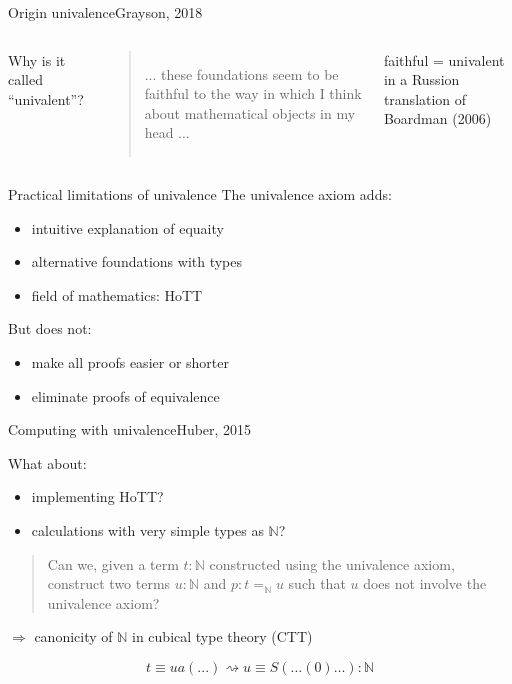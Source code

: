 \documentclass[english]{beamer}
\begin{document}
\begin{frame}{Origin univalence}{Grayson, 2018}
\begin{columns}[c]
            Why is it called ``univalent''?


        \pause

        \begin{quotation}
        ... these foundations seem to be faithful to the way in which I think about mathematical objects in my head ...
        \end{quotation}

        faithful = univalent in a Russion translation of Boardman (2006)

\end{columns}
\end{frame}

\begin{frame}{Practical limitations of univalence}
The univalence axiom adds:
\begin{itemize}
    \item intuitive explanation of equaity
    \item alternative foundations with types
    \item field of mathematics: HoTT
\end{itemize}

But does not:
\begin{itemize}
    \item make all proofs easier or shorter
    \item eliminate proofs of equivalence
\end{itemize}



\end{frame}

\begin{frame}{Computing with univalence}{Huber, 2015}

What about:
\begin{itemize}
\item implementing HoTT?
\item calculations with very simple types as $\mathbb{N}$?
\end{itemize}

\begin{quotation}
Can we, given a term $t: \mathbb{N}$ constructed using the univalence axiom, construct two terms $u : \mathbb{N}$ and $p : t =_{\mathbb{N}} u$ such that $u$ does not involve the univalence axiom?
\end{quotation}

\pause

 $\Rightarrow$ canonicity of $\mathbb{N}$ in cubical type theory (CTT)

$$ t \equiv ua ( ... )  \rightsquigarrow u \equiv S ( \dots ( 0 ) \ldots ) : \mathbb{N}  $$


\end{frame}
\end{document}
